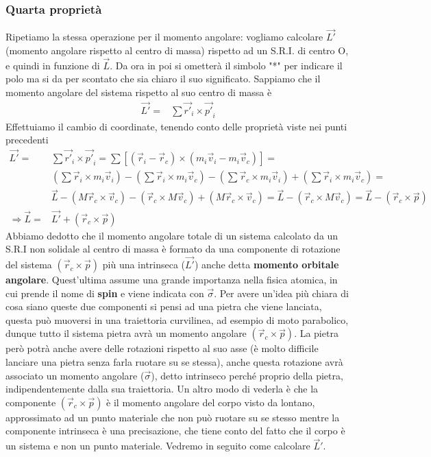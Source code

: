 \documentclass[10pt,a4paper]{article}
\begin{document}
\subsubsection{Quarta proprietà}\label{sec:quartaprop}
Ripetiamo la stessa operazione per il momento angolare: vogliamo calcolare $\vec{L'}$ (momento angolare rispetto al centro di massa) rispetto ad un S.R.I. di centro O, e quindi in funzione di $\vec{L}$. Da ora in poi si ometterà il simbolo "*" per indicare il polo ma si da per scontato che sia chiaro il suo significato. Sappiamo che il momento angolare del sistema rispetto al suo centro di massa è
\begin{align*}
	\vec{L'}=& \sum\vec{r'}_i \times \vec{p'}_i
\end{align*}
Effettuiamo il cambio di coordinate, tenendo conto delle proprietà viste nei punti precedenti
\begin{align*}
	\vec{L'}=& \sum\vec{r'}_i \times \vec{p'}_i= \sum [(\vec{r}_i-\vec{r}_c) \times (m_i\vec{v}_i-m_i\vec{v}_c)]=\\
	&(\sum\vec{r}_i\times m_i \vec{v}_i)-(\sum\vec{r}_i\times m_i \vec{v}_c)-(\sum\vec{r}_c\times m_i \vec{v}_i)+(\sum\vec{r}_i\times m_i \vec{v}_c)=\\
	&\vec{L}-(M \vec{r}_c \times \vec{v}_c)-(\vec{r}_c \times M \vec{v}_c)+(M \vec{r}_c \times \vec{v}_c)=\vec{L}-(\vec{r}_c \times M \vec{v}_c)=\vec{L}-(\vec{r}_c \times \vec{p})\\
	\Rightarrow \vec{L} =& \vec{L'}+ (\vec{r}_c \times \vec{p})
\end{align*}
Abbiamo dedotto che il momento angolare totale di un sistema calcolato da un S.R.I non solidale al centro di massa è formato da una componente di rotazione del sistema $(\vec{r}_c \times \vec{p})$ più una intrinseca ($\vec{L'}$) anche detta \textbf{momento orbitale angolare}. Quest'ultima assume una grande importanza nella fisica atomica, in cui prende il nome di \textbf{spin} e viene indicata con $\vec{\sigma}$. Per avere un'idea più chiara di cosa siano queste due componenti si pensi ad una pietra che viene lanciata, questa può muoversi in una traiettoria curvilinea, ad esempio di moto parabolico, dunque tutto il sistema pietra avrà un momento angolare $(\vec{r}_c \times \vec{p})$. La pietra però potrà anche avere delle rotazioni rispetto al suo asse (è molto difficile lanciare una pietra senza farla ruotare su se stessa), anche questa rotazione avrà associato un momento angolare ($\vec{\sigma}$), detto intrinseco perché proprio della pietra, indipendentemente dalla sua traiettoria. Un altro modo di vederla è che la componente $(\vec{r}_c \times \vec{p})$ è il momento angolare del corpo visto da lontano, approssimato ad un punto materiale che non può ruotare su se stesso mentre la componente intrinseca è una precisazione, che tiene conto del fatto che il corpo è un sistema e non un punto materiale. Vedremo in seguito come calcolare $\vec{L}'$. 
 
\end{document}
